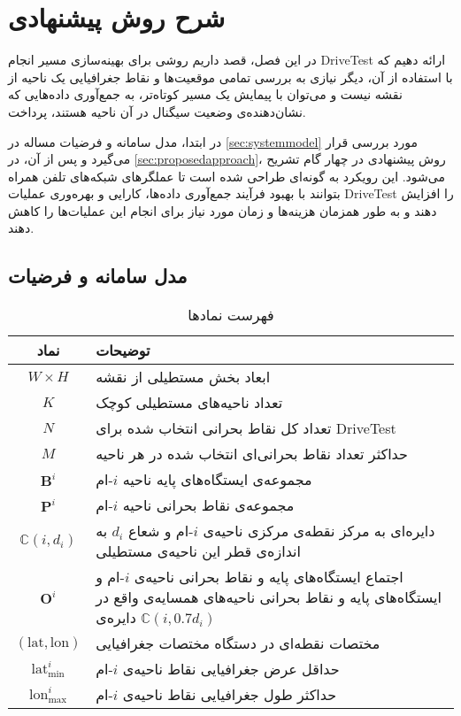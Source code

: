 \chapter{شرح روش پیشنهادی}
\label{chap:approach}

در این فصل، قصد داریم روشی برای بهینه‌سازی مسیر انجام 
\gls{DriveTest}
ارائه دهیم که با استفاده از آن، دیگر نیازی به بررسی تمامی موقعیت‌ها و نقاط جغرافیایی یک ناحیه از نقشه نیست و می‌توان با پیمایش یک مسیر کوتاه‌تر، به جمع‌آوری داده‌هایی که نشان‌دهنده‌ی وضعیت سیگنال در آن ناحیه هستند، پرداخت. 

در ابتدا، مدل سامانه و فرضیات مساله در 
\autoref{sec:systemmodel}
مورد بررسی قرار می‌گیرد و پس از آن، در 
\autoref{sec:proposedapproach}،
روش پیشنهادی در چهار گام تشریح می‌شود. این رویکرد به گونه‌ای طراحی شده است تا عملگرهای شبکه‌های تلفن همراه بتوانند با بهبود فرآیند جمع‌آوری داده‌ها، کارایی و بهره‌وری عملیات \gls{DriveTest} را افزایش دهند و به‌ طور همزمان هزینه‌ها و زمان مورد نیاز برای انجام این عملیات‌ها را کاهش دهند.

\section{مدل سامانه و فرضیات}
\label{sec:systemmodel}


\begin{table}
	\centering
	\renewcommand{\arraystretch}{2}
	\caption{فهرست نمادها}
	\begin{tabular}{cp{13cm}}
		\toprule
		\textbf{نماد} &  \textbf{توضیحات} \\
		\midrule
		$W\times H$ &
		ابعاد بخش مستطیلی از نقشه \\
		$K$ &
		تعداد ناحیه‌های مستطیلی کوچک \\
		$N$ &
		تعداد کل نقاط بحرانی‌ انتخاب شده برای \gls{DriveTest} \\
		$M$ &
		حداکثر تعداد نقاط بحرانی‌‌ای انتخاب شده در هر ناحیه \\
		$\mathbf{B}^i$ &
		مجموعه‌ی ایستگاه‌های پایه ناحیه $i$-ام \\
		$\mathbf{P}^i$ &
		مجموعه‌ی نقاط بحرانی ناحیه $i$-ام \\
		$\mathbb{C}(i, d_i)$ &
		دایره‌ای به مرکز نقطه‌ی مرکزی ناحیه‌ی $i$-ام و شعاع $d_i$ به اندازه‌ی قطر این ناحیه‌ی مستطیلی \\
		$\mathbf{O}^i$ &
		اجتماع ایستگاه‌های پایه و نقاط بحرانی ناحیه‌ی $i$-ام و ایستگاه‌های پایه و نقاط بحرانی ناحیه‌های همسایه‌ی‌ واقع در دایره‌ی $\mathbb{C}(i, 0.7d_i)$
		\\
		$(\text{lat},\text{lon})$ &
		مختصات نقطه‌ای در دستگاه مختصات جغرافیایی \\
		$\text{lat}_{\min}^i$ &
		حداقل عرض جغرافیایی نقاط ناحیه‌ی $i$-ام \\
		$\text{lon}_{\max}^i$ &
		حداکثر طول جغرافیایی نقاط ناحیه‌ی $i$-ام \\
		\bottomrule 
	\end{tabular}
	\label{tab:symbols}
\end{table}


